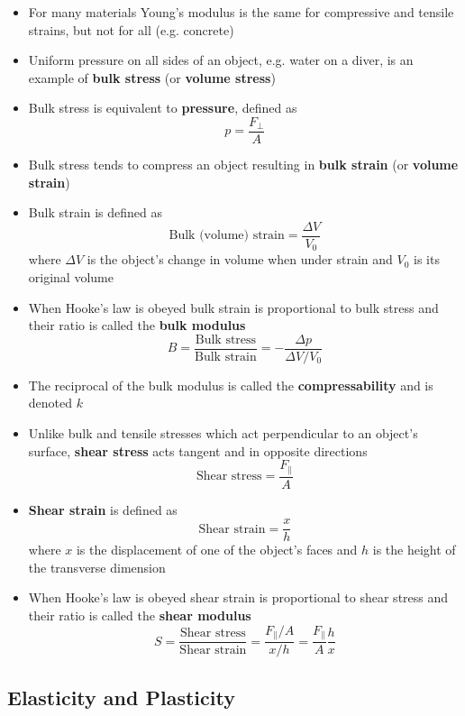 \documentclass{article}
\begin{document}
\begin{itemize}
    \item For many materials Young's modulus is the same for compressive and tensile strains, but not for all (e.g. concrete)

    \item Uniform pressure on all sides of an object, e.g. water on a diver, is an example of \textbf{bulk stress} (or \textbf{volume stress})

    \item Bulk stress is equivalent to \textbf{pressure}, defined as \[p=\frac{F_\perp}{A}\]

    \item Bulk stress tends to compress an object resulting in \textbf{bulk strain} (or \textbf{volume strain})

    \item Bulk strain is defined as \[\textrm{Bulk (volume) strain} = \frac{\Delta V}{V_0}\] where $\Delta V$ is the object's change in volume when under strain and $V_0$ is its original volume

    \item When Hooke's law is obeyed bulk strain is proportional to bulk stress and their ratio is called the \textbf{bulk modulus} \[B = \frac{\textrm{Bulk stress}}{\textrm{Bulk strain}} = - \frac{\Delta p}{\Delta V / V_0}\]

    \item The reciprocal of the bulk modulus is called the \textbf{compressability} and is denoted $k$

    \item Unlike bulk and tensile stresses which act perpendicular to an object's surface, \textbf{shear stress} acts tangent and in opposite directions \[\textrm{Shear stress} = \frac{F_\parallel}{A}\]

    \item \textbf{Shear strain} is defined as \[\textrm{Shear strain} = \frac{x}{h}\] where $x$ is the displacement of one of the object's faces and $h$ is the height of the transverse dimension

    \item When Hooke's law is obeyed shear strain is proportional to shear stress and their ratio is called the \textbf{shear modulus} \[S=\frac{\textrm{Shear stress}}{\textrm{Shear strain}}=\frac{F_\parallel / A}{x / h} = \frac{F_\parallel}{A}\frac{h}{x}\]
\end{itemize}

\subsection{Elasticity and Plasticity}
\end{document}
